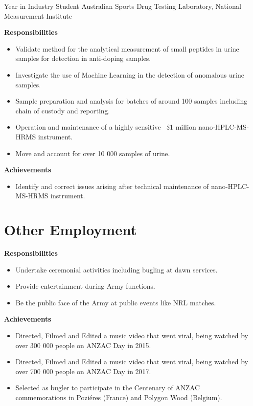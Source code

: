 {Year in Industry Student}
{Australian Sports Drug Testing Laboratory, National Measurement Institute}
{}{}
{%
\textbf{Responsibilities}
  \begin{itemize}
    \item Validate method for the analytical measurement of small peptides in urine samples
      for detection in anti-doping samples.
    \item Investigate the use of Machine Learning in the detection of anomalous urine samples.
    \item Sample preparation and analysis for batches of around 100 samples including chain of custody and reporting.
    \item Operation and maintenance of a highly sensitive ~\$1 million nano-HPLC-MS-HRMS instrument.
    \item Move and account for over 10 000 samples of urine.
  \end{itemize}
  \textbf{Achievements}
  \begin{itemize}
    \item Identify and correct issues arising after technical maintenance of nano-HPLC-MS-HRMS instrument.
  \end{itemize}
}

\section{Other Employment}

{}{}
{%
\textbf{Responsibilities}
\begin{itemize}
  \item Undertake ceremonial activities including bugling at dawn services.
  \item Provide entertainment during Army functions.
  \item Be the public face of the Army at public events like NRL matches.
\end{itemize}
\textbf{Achievements}
\begin{itemize}
  \item Directed, Filmed and Edited a music video  that went viral, being watched by over 300 000 people on ANZAC Day in 2015.
  \item Directed, Filmed and Edited a music video  that went viral, being watched by over 700 000 people on ANZAC Day in 2017.
  \item Selected as bugler to participate in the Centenary of ANZAC commemorations in Poziéres (France) and Polygon Wood (Belgium).
\end{itemize}
}


